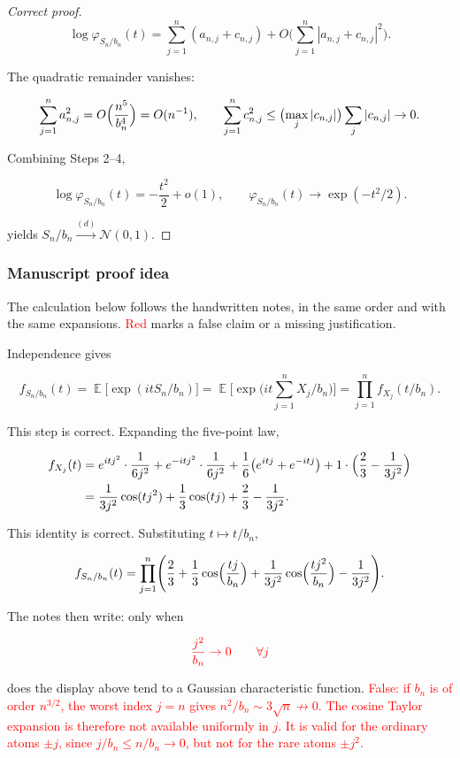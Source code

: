 \documentclass[11pt,a4paper]{article}
\newcommand{\mserr}[1]{\textcolor{red}{#1}}
\DeclareMathOperator{\E}{\mathbb{E}}
\begin{document}
\begin{proof}[Correct proof]
\[
\log\varphi_{S_{n}/b_{n}}(t)
=
\sum_{j=1}^{n}(a_{n,j}+c_{n,j})
+
O\Biggl(\sum_{j=1}^{n}|a_{n,j}+c_{n,j}|^{2}\Biggr).
\]

The quadratic remainder vanishes:

\[
\sum_{j=1}^{n}a_{n,j}^{2}
=
O\Bigl(\frac{n^{5}}{b_{n}^{4}}\Bigr)
=
O(n^{-1}),
\qquad
\sum_{j=1}^{n}c_{n,j}^{2}
\le
\bigl(\max_{j}|c_{n,j}|\bigr)\sum_{j}|c_{n,j}|
\to 0.
\]

Combining Steps 2--4,

\[
\log\varphi_{S_{n}/b_{n}}(t)
=
-\frac{t^{2}}{2}+o(1),
\qquad
\varphi_{S_{n}/b_{n}}(t)
\to
\exp(-t^{2}/2).
\]

 yields \(S_{n}/b_{n}\xrightarrow{(d)}\mathcal{N}(0,1)\).
\end{proof}

\subsubsection{Manuscript proof idea}

The calculation below follows the handwritten notes, in the same order and with the same expansions. \mserr{Red} marks a false claim or a missing justification.

Independence gives

\[
f_{S_{n}/b_{n}}(t)
=
\E\bigl[\exp(it S_{n}/b_{n})\bigr]
=
\E\Biggl[\exp\Biggl(it\sum_{j=1}^{n}X_{j}/b_{n}\Biggr)\Biggr]
=
\prod_{j=1}^{n}
f_{X_{j}}(t/b_{n}).
\]

This step is correct. Expanding the five-point law,

\[
\begin{aligned}
f_{X_{j}}(t)
&=
e^{itj^{2}}\cdot\frac{1}{6j^{2}}
+
e^{-itj^{2}}\cdot\frac{1}{6j^{2}}
+
\frac16\bigl(e^{itj}+e^{-itj}\bigr)
+
1\cdot\Bigl(\frac23-\frac{1}{3j^{2}}\Bigr)
\\
&=
\frac{1}{3j^{2}}\cos(tj^{2})
+
\frac13\cos(tj)
+
\frac23
-
\frac{1}{3j^{2}}.
\end{aligned}
\]

This identity is correct. Substituting \(t\mapsto t/b_{n}\),

\[
f_{S_{n}/b_{n}}(t)
=
\prod_{j=1}^{n}
\Biggl(
\frac23
+
\frac13\cos\Bigl(\frac{tj}{b_{n}}\Bigr)
+
\frac{1}{3j^{2}}\cos\Bigl(\frac{tj^{2}}{b_{n}}\Bigr)
-
\frac{1}{3j^{2}}
\Biggr).
\]

The notes then write: only when

\[
\mserr{\frac{j^{2}}{b_{n}}\to 0 \qquad \forall j}
\]

does the display above tend to a Gaussian characteristic function. \mserr{False: if \(b_{n}\) is of order \(n^{3/2}\), the worst index \(j=n\) gives \(n^{2}/b_{n}\sim 3\sqrt{n}\not\to 0\). The cosine Taylor expansion is therefore not available uniformly in \(j\). It is valid for the ordinary atoms \(\pm j\), since \(j/b_{n}\le n/b_{n}\to 0\), but not for the rare atoms \(\pm j^{2}\).}
\end{document}
